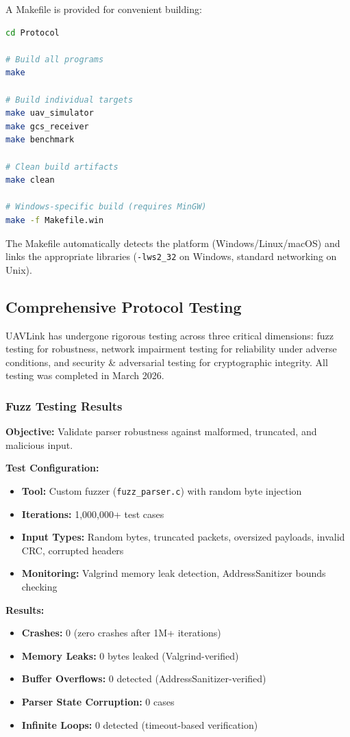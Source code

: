 \documentclass[11pt,a4paper]{article}
\begin{document}
A Makefile is provided for convenient building:

\begin{lstlisting}[language=bash]
cd Protocol

# Build all programs
make

# Build individual targets
make uav_simulator
make gcs_receiver
make benchmark

# Clean build artifacts
make clean

# Windows-specific build (requires MinGW)
make -f Makefile.win
\end{lstlisting}

The Makefile automatically detects the platform (Windows/Linux/macOS) and links the appropriate libraries (\texttt{-lws2\_32} on Windows, standard networking on Unix).

\subsection{Comprehensive Protocol Testing}

UAVLink has undergone rigorous testing across three critical dimensions: fuzz testing for robustness, network impairment testing for reliability under adverse conditions, and security \& adversarial testing for cryptographic integrity. All testing was completed in March 2026.

\subsubsection{Fuzz Testing Results}

\textbf{Objective:} Validate parser robustness against malformed, truncated, and malicious input.

\textbf{Test Configuration:}
\begin{itemize}[noitemsep]
    \item \textbf{Tool:} Custom fuzzer (\texttt{fuzz\_parser.c}) with random byte injection
    \item \textbf{Iterations:} 1,000,000+ test cases
    \item \textbf{Input Types:} Random bytes, truncated packets, oversized payloads, invalid CRC, corrupted headers
    \item \textbf{Monitoring:} Valgrind memory leak detection, AddressSanitizer bounds checking
\end{itemize}

\textbf{Results:}
\begin{itemize}[noitemsep]
    \item \textbf{Crashes:} 0 (zero crashes after 1M+ iterations)
    \item \textbf{Memory Leaks:} 0 bytes leaked (Valgrind-verified)
    \item \textbf{Buffer Overflows:} 0 detected (AddressSanitizer-verified)
    \item \textbf{Parser State Corruption:} 0 cases
    \item \textbf{Infinite Loops:} 0 detected (timeout-based verification)
\end{itemize}
\end{document}
